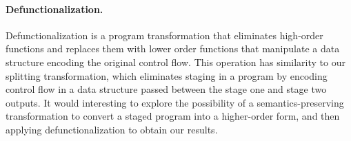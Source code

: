 \paragraph{Defunctionalization.}
Defunctionalization \cite{Reynolds72} is a program transformation
that eliminates high-order functions and replaces them with lower
order functions that manipulate a data structure encoding the original control flow.
This operation has similarity to our splitting transformation, 
which eliminates staging in a program by encoding control flow in a data structure
passed between the stage one and stage two outputs.
It would interesting to explore the possibility of a semantics-preserving transformation
to convert a staged program into a higher-order form,
and then applying defunctionalization to obtain our results.
